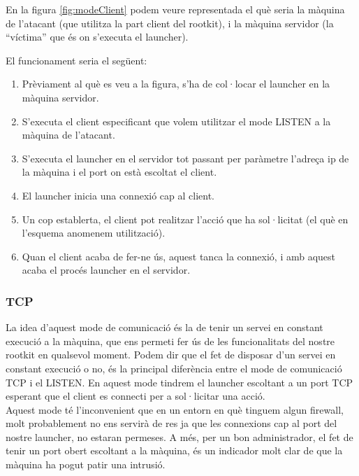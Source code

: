 En la figura \ref{fig:modeClient} podem veure representada el què seria la màquina de l'atacant (que utilitza la part client del rootkit),
i la màquina servidor (la ``víctima'' que és on s'executa el launcher).

El funcionament seria el següent:
\begin{enumerate}
    \item Prèviament al què es veu a la figura, s'ha de col·locar el launcher en la màquina servidor.
    \item S'executa el client especificant que volem utilitzar el mode LISTEN a la màquina de l'atacant.
    \item S'executa el launcher en el servidor tot passant per paràmetre l'adreça ip de la màquina i el port on està escoltat
        el client.
    \item El launcher inicia una connexió cap al client.
    \item Un cop establerta, el client pot realitzar l'acció que ha sol·licitat (el què en l'esquema anomenem utilització).
    \item Quan el client acaba de fer-ne ús, aquest tanca la connexió, i amb aquest acaba el procés launcher en el servidor.
\end{enumerate}

\subsubsection{TCP} \label{sec:TCP}
La idea d'aquest mode de comunicació és la de tenir un servei en constant execució a la màquina, que ens permeti
fer ús de les funcionalitats del nostre rootkit en qualsevol moment. Podem dir que el fet de disposar d'un servei en constant 
execució o no, és la principal diferència entre el mode de comunicació TCP i el LISTEN. En aquest mode tindrem el launcher 
escoltant a un port TCP esperant que el client es connecti per a sol·licitar una acció. \\

Aquest mode té l'inconvenient que en un entorn en què tinguem algun firewall, molt probablement no ens 
servirà de res ja que les connexions cap al port del nostre launcher, no estaran permeses. A més, per un bon administrador, el 
fet de tenir un port obert escoltant a la màquina, és un indicador molt clar de que la màquina ha pogut patir una intrusió. \\

